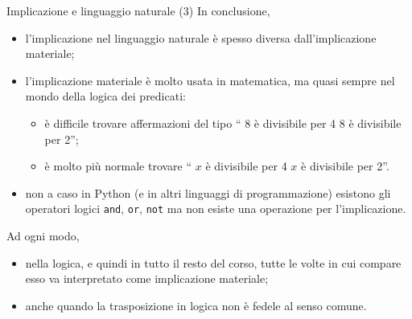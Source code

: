 \documentclass[aspectratio=169,10pt,dvipsnames,handout]{beamer}
\begin{document}
\begin{frame}{Implicazione e linguaggio naturale (3)}
    In conclusione,
    \begin{itemize}
        \item l'implicazione nel linguaggio naturale è spesso diversa dall'implicazione materiale;
        \item l'implicazione materiale è molto usata in matematica, ma quasi sempre nel mondo della logica dei predicati:
              \begin{itemize}
                  \item è difficile trovare affermazioni del tipo `` 8 è divisibile per 4  8 è divisibile per 2'';
                  \item è molto più normale trovare `` $x$ è divisibile per 4  $x$ è divisibile per 2''.
              \end{itemize}
        \item non a caso in Python (e in altri linguaggi di programmazione) esistono gli operatori logici \texttt{and}, \texttt{or}, \texttt{not} ma non esiste una operazione per l'implicazione.
    \end{itemize}
    \pause
    Ad ogni modo,
    \begin{itemize}
        \item nella logica, e quindi in tutto il resto del corso, tutte le volte in cui compare  esso va interpretato come implicazione materiale;
        \item anche quando la trasposizione in logica non è fedele al senso comune.
    \end{itemize}
\end{frame}
\end{document}
